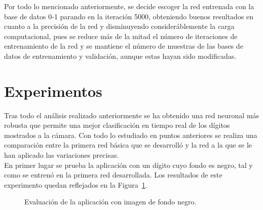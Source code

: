 Por todo lo mencionado anteriormente, se decide escoger la red entrenada con la base de datos 0-1 parando en la iteración 5000, obteniendo buenos resultados en cuanto a la precisión de la red y disminuyendo consideráblemente la carga computacional, pues se reduce más de la mitad el número de iteraciones de entrenamiento de la red y se mantiene el número de muestras de las bases de datos de entrenamiento y validación, aunque estas hayan sido modificadas.\\

\section{Experimentos}
Tras todo el análisis realizado anteriormente se ha obtenido una red neuronal más robusta que permite una mejor clasificación en tiempo real de los dígitos mostrados a la cámara. Con todo lo estudiado en puntos anteriores se realiza una comparación entre la primera red básica que se desarrolló y la red a la que se le han aplicado las variaciones precisas.\\

En primer lugar se prueba la aplicación con un dígito cuyo fondo es negro, tal y como se entrenó en la primera red desarrollada. Los resultados de este experimento quedan reflejados en la Figura~\ref{fig.experimento1}.

\begin{figure}[H]
	\centering
	 \hspace{5pt}
	\caption{Evaluación de la aplicación con imagen de fondo negro.}
	\label{fig.experimento1}
\end{figure}

